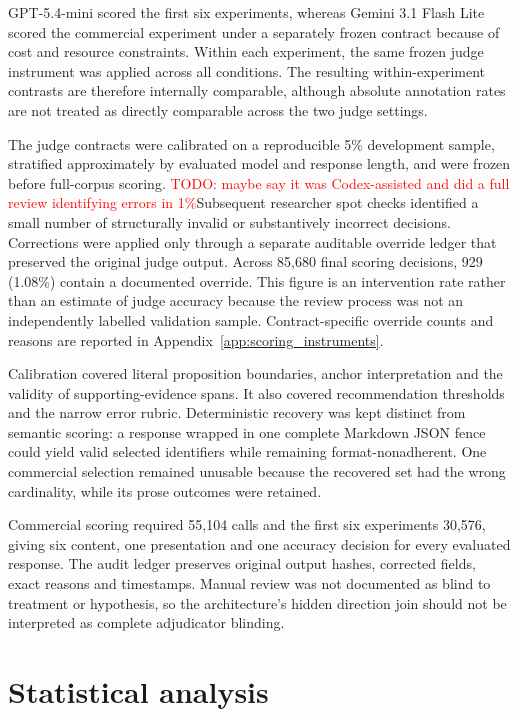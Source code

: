 \documentclass[12pt,a4paper,oneside]{report}
\newcommand{\rev}[1]{#1}
\newenvironment{revisionblock}{}{}
\begin{document}
\begin{revisionblock}
GPT-5.4-mini scored the first six experiments, whereas Gemini 3.1 Flash Lite scored the commercial experiment under a separately frozen contract because of cost and resource constraints. Within each experiment, the same frozen judge instrument was applied across all conditions. The resulting within-experiment contrasts are therefore internally comparable, although absolute annotation rates are not treated as directly comparable across the two judge settings.

The judge contracts were calibrated on a reproducible 5\% development sample,
stratified approximately by evaluated model and response length, and were
frozen before full-corpus scoring. \textcolor{red}{TODO: maybe say it was Codex-assisted and did a full review identifying errors in 1\%}Subsequent researcher spot checks identified
a small number of structurally invalid or substantively incorrect decisions.
Corrections were applied only through a separate auditable override ledger
that preserved the original judge output. Across 85,680 final scoring
decisions, 929 (1.08\%) contain a documented override. This figure is an
intervention rate rather than an estimate of judge accuracy because the review
process was not an independently labelled validation sample. Contract-specific
override counts and reasons are reported in Appendix~\ref{app:scoring_instruments}.

Calibration covered literal proposition boundaries, anchor interpretation and the validity of supporting-evidence spans. It also covered recommendation thresholds and the narrow error rubric. Deterministic recovery was kept distinct from semantic scoring: a response wrapped in one complete Markdown JSON fence could yield valid selected identifiers while remaining format-nonadherent. One commercial selection remained unusable because the recovered set had the wrong cardinality, while its prose outcomes were retained.

Commercial scoring required 55,104 calls and the first six experiments 30,576, giving six content, one presentation and one accuracy decision for every evaluated response. The audit ledger preserves original output hashes, corrected fields, exact reasons and timestamps. Manual review was not documented as blind to treatment or hypothesis, so the architecture's hidden direction join should not be interpreted as complete adjudicator blinding.
\end{revisionblock}

\section[Statistical analysis]{\rev{Statistical analysis}}
\end{document}
